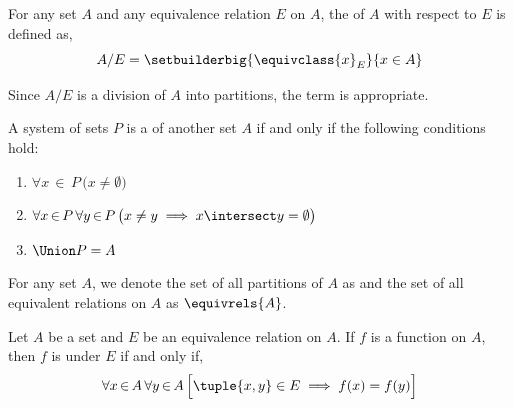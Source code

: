 \begin{dfn}
    \label{dfn:quotient-set}
    For any set \( A \) and any equivalence relation \( E \) on \( A \), the  of \( A \) with respect to
    \( E \) is defined as,
    \begin{equation*}
        A / E = \setbuilderbig{\equivclass{x}_{E}}{x \in A}
    \end{equation*}
\end{dfn}

\begin{rem}
    Since \( A / E \) is a division of \( A \) into partitions, the term  is appropriate.
\end{rem}

\begin{dfn}[Partition]
    \label{dfn:partition-of-a-set}
    A system of sets \( P \) is a  of another set \( A \) if and only if the following
    conditions hold:
    \begin{enumerate}[topsep=2pt,label=\texttt{\textup{(\alph*)}}]
        \item \( \forall x\,{\in}\,P \, \big( x \neq \emptyset \big) \)
        \item \( \forall x\,{\in}\,P \, \forall y\,{\in}\,P \, \big( x \neq y \implies x \intersect y = \emptyset \big) \)
        \item \( \Union P = A \)
    \end{enumerate}
\end{dfn}

\begin{dfn}
    \label{dfn:set-of-all-partitions-of-a-set-and-the-set-of-all-equivalence-relations-on-a-set}
    For any set \( A \), we denote the set of all partitions of \( A \) as  and
    the set of all equivalent relations on \( A \) as \( \equivrels{A} \).
\end{dfn}

\begin{dfn}
    \label{dfn:class-invariance}
    Let \( A \) be a set and \( E \) be an equivalence relation on \( A \).
    If \( f \) is a function on \( A \), then \( f \) is 
    under \( E \) if and only if,
    \begin{equation*}
        \forall x\,{\in}\,A \, \forall y\,{\in}\,A \, \Big[ \tuple{x,y} \in E \implies f(x) = f(y) \Big]
    \end{equation*}
\end{dfn}

